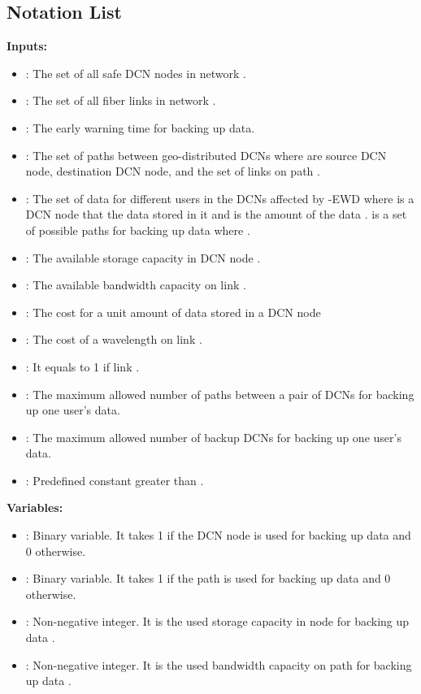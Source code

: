 \documentclass[conference]{IEEEtran}\IEEEoverridecommandlockouts
\begin{document}
 \subsection{Notation List}\label{Notation List}
\textbf{Inputs:}
\begin{itemize} []
\item : The set of all safe DCN nodes in network .
 \item : The set of all fiber links in network .
 \item : The early warning time for backing up data.
 \item : The set of paths between geo-distributed DCNs where  are source DCN node, destination DCN node, and the set of links on path .
 \item : The set of  data for different users in the DCNs affected by   -EWD where  is  a  DCN node that the data  stored in it and  is the  amount of the data .  is a set of possible paths for backing up data  where .
 \item : The available storage capacity in DCN  node .
 \item : The available bandwidth capacity on link .
 \item : The cost  for a unit amount of data stored in a DCN node 
  \item :  The cost of a wavelength on link .
  \item : It equals to 1 if link .
  \item : The maximum allowed number of paths between a pair of DCNs for backing up one user's data.
  \item : The maximum  allowed number of backup DCNs for backing up one user's data.
  \item : Predefined constant greater than .


\end{itemize}
\textbf{ Variables:}
\begin{itemize}
\item : Binary variable. It takes 1 if the DCN node  is used for backing  up data  and 0 otherwise.
\item : Binary variable. It takes 1 if the path   is used for backing up data     and 0 otherwise.
\item : Non-negative integer. It is the used storage capacity in node   for backing up data .
\item : Non-negative integer. It is the used bandwidth capacity on path  for backing up data .
\end{itemize}
\end{document}
